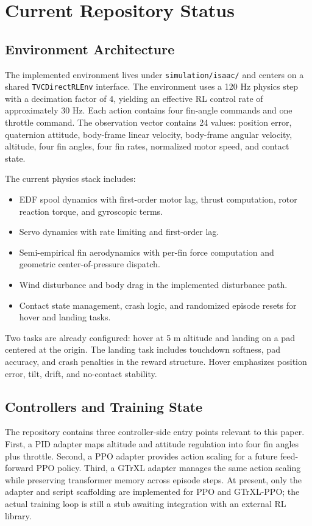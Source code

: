 \documentclass[10pt,twocolumn]{article}
\begin{document}
\section{Current Repository Status}

\subsection{Environment Architecture}

The implemented environment lives under \texttt{simulation/isaac/} and centers on a shared \texttt{TVCDirectRLEnv} interface. The environment uses a 120 Hz physics step with a decimation factor of 4, yielding an effective RL control rate of approximately 30 Hz. Each action contains four fin-angle commands and one throttle command. The observation vector contains 24 values: position error, quaternion attitude, body-frame linear velocity, body-frame angular velocity, altitude, four fin angles, four fin rates, normalized motor speed, and contact state.

The current physics stack includes:
\begin{itemize}
    \item EDF spool dynamics with first-order motor lag, thrust computation, rotor reaction torque, and gyroscopic terms.
    \item Servo dynamics with rate limiting and first-order lag.
    \item Semi-empirical fin aerodynamics with per-fin force computation and geometric center-of-pressure dispatch.
    \item Wind disturbance and body drag in the implemented disturbance path.
    \item Contact state management, crash logic, and randomized episode resets for hover and landing tasks.
\end{itemize}

Two tasks are already configured: hover at 5 m altitude and landing on a pad centered at the origin. The landing task includes touchdown softness, pad accuracy, and crash penalties in the reward structure. Hover emphasizes position error, tilt, drift, and no-contact stability.

\subsection{Controllers and Training State}

The repository contains three controller-side entry points relevant to this paper. First, a PID adapter maps altitude and attitude regulation into four fin angles plus throttle. Second, a PPO adapter provides action scaling for a future feed-forward PPO policy. Third, a GTrXL adapter manages the same action scaling while preserving transformer memory across episode steps. At present, only the adapter and script scaffolding are implemented for PPO and GTrXL-PPO; the actual training loop is still a stub awaiting integration with an external RL library.
\end{document}
